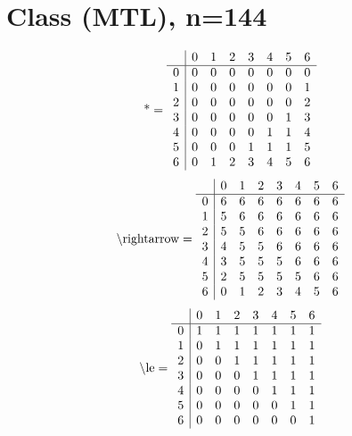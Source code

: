 \documentclass[11pt]{article}
\begin{document}
\section{Class (MTL), n=144}
\[\text{*} = 
\begin{array}{r | r r r r r r r}
 & 0 & 1 & 2 & 3 & 4 & 5 & 6 \\ \hline
0 & 0 & 0 & 0 & 0 & 0 & 0 & 0 \\
1 & 0 & 0 & 0 & 0 & 0 & 0 & 1 \\
2 & 0 & 0 & 0 & 0 & 0 & 0 & 2 \\
3 & 0 & 0 & 0 & 0 & 0 & 1 & 3 \\
4 & 0 & 0 & 0 & 0 & 1 & 1 & 4 \\
5 & 0 & 0 & 0 & 1 & 1 & 1 & 5 \\
6 & 0 & 1 & 2 & 3 & 4 & 5 & 6 \\
\end{array}
\]
\[\text{\textbackslash rightarrow} = 
\begin{array}{r | r r r r r r r}
 & 0 & 1 & 2 & 3 & 4 & 5 & 6 \\ \hline
0 & 6 & 6 & 6 & 6 & 6 & 6 & 6 \\
1 & 5 & 6 & 6 & 6 & 6 & 6 & 6 \\
2 & 5 & 5 & 6 & 6 & 6 & 6 & 6 \\
3 & 4 & 5 & 5 & 6 & 6 & 6 & 6 \\
4 & 3 & 5 & 5 & 5 & 6 & 6 & 6 \\
5 & 2 & 5 & 5 & 5 & 5 & 6 & 6 \\
6 & 0 & 1 & 2 & 3 & 4 & 5 & 6 \\
\end{array}
\]
\[\text{\textbackslash le} = 
\begin{array}{r | r r r r r r r}
 & 0 & 1 & 2 & 3 & 4 & 5 & 6 \\ \hline
0 & 1 & 1 & 1 & 1 & 1 & 1 & 1 \\
1 & 0 & 1 & 1 & 1 & 1 & 1 & 1 \\
2 & 0 & 0 & 1 & 1 & 1 & 1 & 1 \\
3 & 0 & 0 & 0 & 1 & 1 & 1 & 1 \\
4 & 0 & 0 & 0 & 0 & 1 & 1 & 1 \\
5 & 0 & 0 & 0 & 0 & 0 & 1 & 1 \\
6 & 0 & 0 & 0 & 0 & 0 & 0 & 1 \\
\end{array}
\]
\end{document}
